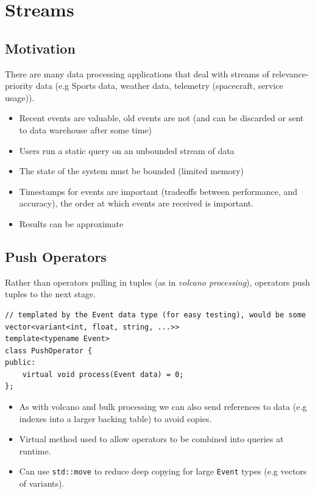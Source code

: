 \chapter{Streams}

\section{Motivation}
There are many data processing applications that deal with streams of relevance-priority data (e.g Sports data, weather data, telemetry (spacecraft, service usage)).
\begin{itemize}
    \item Recent events are valuable, old events are not (and can be discarded or sent to data warehouse after some time)
    \item Users run a static query on an unbounded stream of data
    \item The state of the system must be bounded (limited memory)
    \item Timestamps for events are important (tradeoffs between performance, and accuracy), the order at which events are received is important.
    \item Results can be approximate
\end{itemize}

\section{Push Operators}
Rather than operators pulling in tuples (as in \textit{volcano processing}), operators push tuples to the next stage.
\begin{verbatim}
// templated by the Event data type (for easy testing), would be some vector<variant<int, float, string, ...>>
template<typename Event>
class PushOperator {
public:
    virtual void process(Event data) = 0;
};
\end{verbatim}
\begin{itemize}
    \item As with volcano and bulk processing we can also send references to data (e.g indexes into a larger backing table) to avoid copies.
    \item Virtual method used to allow operators to be combined into queries at runtime.
    \item Can use \texttt{std::move} to reduce deep copying for large \texttt{Event} types (e.g vectors of variants).
\end{itemize}


